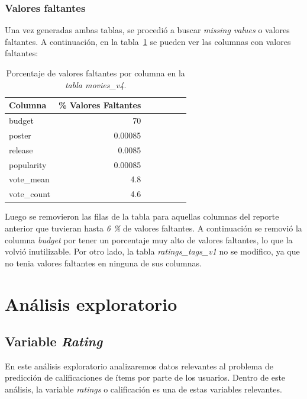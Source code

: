 \documentclass[11pt,a4paper,twoside]{thesis}
\begin{document}
\subsubsection*{Valores faltantes}

Una vez generadas ambas tablas, se procedió a buscar \textit{missing values} o
valores faltantes. A continuación, en la tabla~\ref{table:tab} se pueden ver
las columnas con valores faltantes:

\begin{table}[h!]
	\centering
	\footnotesize
	\begin{tabular}{lrrrrrr}
		\hline
		Columna     & \% Valores Faltantes \\
		\hline
		budget      & 70                   \\
		poster      & 0.00085              \\
		release     & 0.0085               \\
		popularity  & 0.00085              \\
		vote\_mean  & 4.8                  \\
		vote\_count & 4.6                  \\
		\hline
	\end{tabular}
	\caption{Porcentaje de valores faltantes por columna en la \textit{tabla movies\_v4}.}
	\label{table:tab}
\end{table}

Luego se removieron las filas de la tabla para aquellas columnas del reporte
anterior que tuvieran hasta \textit{6 \%} de valores faltantes. A continuación
se removió la columna \textit{budget} por tener un porcentaje muy alto de
valores faltantes, lo que la volvió inutilizable. Por otro lado, la tabla
\textit{ratings\_tags\_v1} no se modifico, ya que no tenia valores faltantes en
ninguna de sus columnas.

\clearpage

\section{Análisis exploratorio}

\subsection{Variable \textit{Rating}}

En este análisis exploratorio analizaremos datos relevantes al problema de
predicción de calificaciones de ítems por parte de los usuarios. Dentro de este
análisis, la variable \textit{ratings} o calificación es una de estas variables
relevantes.
\end{document}
